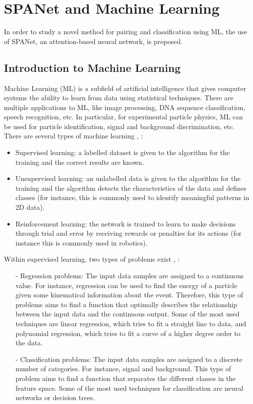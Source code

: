 \section{SPANet and Machine Learning} \label{section: spanet architecture}


In order to study a novel method for pairing and classification using ML, the use of SPANet, an attention-based neural network, is proposed.


\subsection{Introduction to Machine Learning}

Machine Learning (ML) is a subfield of artificial intelligence that gives computer systems the ability to learn from data using statistical techniques. There are multiple applications to ML, like image processing, DNA sequence classification, speech recognition, etc. In particular, for experimental particle physics, ML can be used for particle identification, signal and background discrimination, etc. There are several types of machine learning \cite{neutrinoslides}, \cite{Mauro}:
\begin{itemize}
    \item Supervised learning: a labelled dataset is given to the algorithm for the training and the correct results are known.
   \item Unsupervised learning: an unlabelled data is given to the algorithm for the training and the algorithm detects the characteristics of the data and defines classes (for instance, this is commonly used to identify meaningful patterns in 2D data).
   \item Reinforcement learning: the network is trained to learn to make decisions through trial and error by receiving rewards or penalties for its actions (for instance this is commonly used in robotics).
\end{itemize}

\noindent Within supervised learning, two types of problems exist \cite{neutrinoslides}, \cite{TesiMatteo}:
   \begin{itemize}
       \item [-] Regression problems: The input data samples are assigned to a continuous value. For instance, regression can be used to find the energy of a particle given some kinematical information about the event. Therefore, this type of problems aims to find a function that optimally describes the relationship between the input data and the continuous output. Some of the most used techniques are linear regression, which tries to fit a straight line to data, and polynomial regression, which tries to fit a curve of a higher degree order to the data.
       \item [-] Classification problems: The input data samples are assigned to a discrete number of categories. For instance, signal and background. This type of problem aims to find a function that separates the different classes in the feature space. Some of the most used techniques for classification are neural networks or decision trees.
   \end{itemize}

